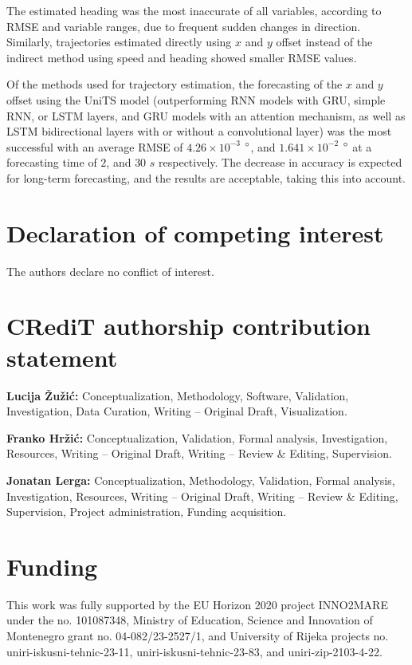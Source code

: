 \documentclass[preprint,12pt]{elsarticle}
\begin{document}
The estimated heading was the most inaccurate of all variables, according to RMSE and variable ranges, due to frequent sudden changes in direction. Similarly, trajectories estimated directly using $x$ and $y$ offset instead of the indirect method using speed and heading showed smaller RMSE values.

Of the methods used for trajectory estimation, the forecasting of the $x$ and $y$ offset using the UniTS model (outperforming RNN models with GRU, simple RNN, or LSTM layers, and GRU models with an attention mechanism, as well as LSTM bidirectional layers with or without a convolutional layer) was the most successful with an average RMSE of $4.26 \times 10^{-3}$ $\degree$, and $1.641 \times 10^{-2}$ $\degree$ at a forecasting time of $2$, and $30$ $s$ respectively. The decrease in accuracy is expected for long-term forecasting, and the results are acceptable, taking this into account.

\section*{Declaration of competing interest}
The authors declare no conflict of interest.

\section*{CRediT authorship contribution statement}

\textbf{Lucija \v{Z}u\v{z}i\'{c}:} Conceptualization, Methodology, Software, Validation, Investigation, Data Curation, Writing -- Original Draft, Visualization. 

\textbf{Franko Hr\v{z}i\'{c}:} Conceptualization,  Validation, Formal analysis, Investigation, Resources, Writing -- Original Draft, Writing -- Review \& Editing, Supervision. 

\textbf{Jonatan Lerga:} Conceptualization, Methodology, Validation, Formal analysis, Investigation, Resources, Writing -- Original Draft, Writing -- Review \& Editing, Supervision, Project administration, Funding acquisition.

\section*{Funding}
This work was fully supported by the EU Horizon 2020 project INNO2MARE under the no. 101087348, Ministry of Education, Science and Innovation of Montenegro grant no. 04-082/23-2527/1, and University of Rijeka projects no. uniri-iskusni-tehnic-23-11, uniri-iskusni-tehnic-23-83, and uniri-zip-2103-4-22.
\end{document}
